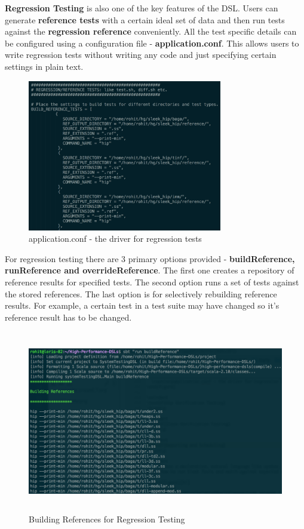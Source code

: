 \documentclass[12pt]{article}
\begin{document}
\noindent
\textbf{Regression Testing} is also one of the key features of the DSL. Users can generate \textbf{reference tests} with a certain ideal set of data and then run tests against the \textbf{regression reference} conveniently. All the test specific details can be configured using a configuration file - \textbf{application.conf}. This allows users to write regression tests without writing any code and just specifying certain settings in plain text.
\bigskip
\begin{figure}[H]
  \centering
    \includegraphics[height=250px]{figures/application_conf.png}
  \caption{application.conf - the driver for regression tests}
\end{figure}

\noindent
For regression testing there are 3 primary options provided  - \textbf{buildReference, runReference and overrideReference}. The first one creates a repository of reference results for specified tests. The second option runs a set of tests against the stored references. The last option is for selectively rebuilding reference results. For example, a certain test in a test suite may have changed so it's reference result has to be changed.
\bigskip

\begin{figure}[H]
  \centering
    \includegraphics[height=300px]{figures/building_reference.png}
  \caption{Building References for Regression Testing}
\end{figure}
\end{document}
